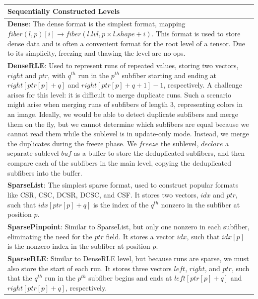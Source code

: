 \begin{table}[h]
    \centering
    \scriptsize
    \renewcommand{\arraystretch}{1.3}
    \begin{tabular}{p{14cm}}

    \hline
    \textbf{Sequentially Constructed Levels} \\
    \hline
    \textbf{Dense}:
    The dense format is the simplest format, mapping $fiber(l, p)[i] \rightarrow fiber(l.lvl, p \times l.shape + i)$.
    This format is used to store dense data and is often a convenient format for the root level of a tensor.
    Due to its simplicity, freezing and thawing the level are no-ops. \\
    \textbf{DenseRLE}:
    Used to represent runs of repeated values, storing two vectors, $right$ and $ptr$, with $q^{th}$ run in the $p^{th}$ subfiber starting and ending at $right[ptr[p] + q]$ and $right[ptr[p] + q + 1] - 1$, respectively.
    A challenge arises for this level: it is difficult to merge duplicate runs.
    Such a scenario might arise when merging runs of subfibers of length 3, representing colors in an image.
    Ideally, we would be able to detect duplicate subfibers and merge them on the fly, but we cannot determine which subfibers are equal because we cannot read them while the sublevel is in update-only mode.
    Instead, we merge the duplicates during the freeze phase.
    We $freeze$ the sublevel, $declare$ a separate sublevel $buf$ as a buffer to store the deduplicated subfibers, and then compare each of the subfibers in the main level, copying the deduplicated subfibers into the buffer. \\
    \textbf{SparseList}:
    The simplest sparse format, used to construct popular formats like CSR, CSC, DCSR, DCSC, and CSF.
    It stores two vectors, $idx$ and $ptr$, such that $idx[ptr[p] + q]$ is the index of the $q^{th}$ nonzero in the subfiber at position $p$. \\
    \textbf{SparsePinpoint}:
    Similar to SparseList, but only one nonzero in each subfiber, eliminating the need for the $ptr$ field.
    It stores a vector $idx$, such that $idx[p]$ is the nonzero index in the subfiber at position $p$. \\
    \textbf{SparseRLE}:
    Similar to DenseRLE level, but because runs are sparse, we must also store the start of each run.
    It stores three vectors $left$, $right$, and $ptr$, such that the $q^{th}$ run in the $p^{th}$ subfiber begins and ends at $left[ptr[p] + q]$ and $right[ptr[p] + q]$, respectively.

\end{tabular}
\end{table}
